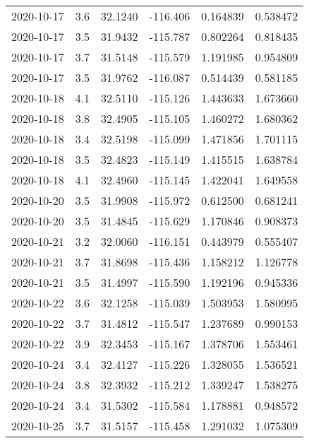 \begin{tabular}{lrrrrr}
2020-10-17 &       3.6 &  32.1240 &  -116.406 &         0.164839 &         0.538472 \\
2020-10-17 &       3.5 &  31.9432 &  -115.787 &         0.802264 &         0.818435 \\
2020-10-17 &       3.7 &  31.5148 &  -115.579 &         1.191985 &         0.954809 \\
2020-10-17 &       3.5 &  31.9762 &  -116.087 &         0.514439 &         0.581185 \\
2020-10-18 &       4.1 &  32.5110 &  -115.126 &         1.443633 &         1.673660 \\
2020-10-18 &       3.8 &  32.4905 &  -115.105 &         1.460272 &         1.680362 \\
2020-10-18 &       3.4 &  32.5198 &  -115.099 &         1.471856 &         1.701115 \\
2020-10-18 &       3.5 &  32.4823 &  -115.149 &         1.415515 &         1.638784 \\
2020-10-18 &       4.1 &  32.4960 &  -115.145 &         1.422041 &         1.649558 \\
2020-10-20 &       3.5 &  31.9908 &  -115.972 &         0.612500 &         0.681241 \\
2020-10-20 &       3.5 &  31.4845 &  -115.629 &         1.170846 &         0.908373 \\
2020-10-21 &       3.2 &  32.0060 &  -116.151 &         0.443979 &         0.555407 \\
2020-10-21 &       3.7 &  31.8698 &  -115.436 &         1.158212 &         1.126778 \\
2020-10-21 &       3.5 &  31.4997 &  -115.590 &         1.192196 &         0.945336 \\
2020-10-22 &       3.6 &  32.1258 &  -115.039 &         1.503953 &         1.580995 \\
2020-10-22 &       3.7 &  31.4812 &  -115.547 &         1.237689 &         0.990153 \\
2020-10-22 &       3.9 &  32.3453 &  -115.167 &         1.378706 &         1.553461 \\
2020-10-24 &       3.4 &  32.4127 &  -115.226 &         1.328055 &         1.536521 \\
2020-10-24 &       3.8 &  32.3932 &  -115.212 &         1.339247 &         1.538275 \\
2020-10-24 &       3.4 &  31.5302 &  -115.584 &         1.178881 &         0.948572 \\
2020-10-25 &       3.7 &  31.5157 &  -115.458 &         1.291032 &         1.075309 \\

\end{tabular}
